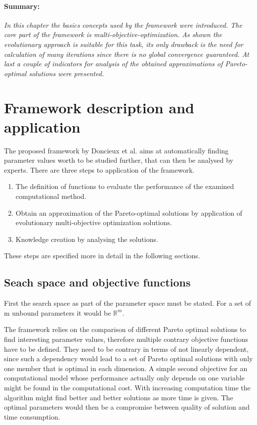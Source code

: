 \documentclass[12pt,twoside]{article}
\theoremstyle{plain}
\theoremstyle{definition}
\theoremstyle{remark}
\begin{document}
\paragraph{Summary:}
\textit{
	In this chapter the basics concepts used by the framework were introduced.
	The core part of the framework is multi-objective-optimization. 
	As shown the evolutionary approach is suitable for this task, its only drawback is the need for calculation of many iterations since there is no global convergence guaranteed.
	At last a couple of indicators for analysis of the obtained approximations of Pareto-optimal solutions were presented.
}

\section{Framework description and application}
\label{sec:model}
The proposed framework by Doncieux et al. \cite{doncieux2015multi} aims at automatically finding parameter values worth to be studied further, that can then be analysed by experts.
There are three steps to application of the framework.
\begin{enumerate}
	\item The definition of functions to evaluate the performance of the examined computational method.
	\item Obtain an approximation of the Pareto-optimal solutions by application of evolutionary multi-objective optimization solutions.
	\item Knowledge creation by analysing the solutions.
\end{enumerate}
These steps are specified more in detail in the following sections.

\subsection{Seach space and objective functions}
First the search space as part of the parameter space must be stated. For a set of m unbound parameters it would be $\mathbb{R}^m$. 

The framework relies on the comparison of different Pareto optimal solutions to find interesting parameter values, therefore multiple contrary objective functions have to be defined.
They need to be contrary in terms of not linearly dependent, since such a dependency would lead to a set of Pareto optimal solutions with only one member that is optimal in each dimension.
A simple second objective for an computational model whose performance actually only depends on one variable might be found in the computational cost.
With increasing computation time the algorithm might find better and better solutions as more time is given. The optimal parameters would then be a compromise between quality of solution and time consumption.
\end{document}
